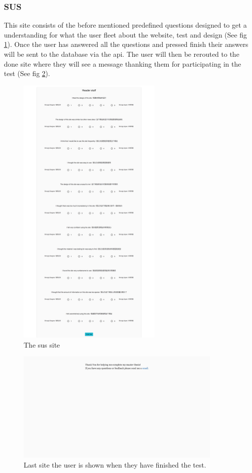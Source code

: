 \subsubsection{SUS}
This site consists of the before mentioned predefined questions designed to get a understanding for what the user fleet about the website, test and design (See fig \ref{fig:sus_site}). Once the user has answered all the questions and pressed finish their answers will be sent to the database via the api. The user will then be rerouted to the done site where they will see a message thanking them for participating in the test (See fig \ref{fig:done_site}).


\begin{figure}[h]
	\centering
	\includegraphics[width=70mm]{Images/sus.png}
	\decoRule
	\caption[SUS]{The sus site}
	\label{fig:sus_site}
\end{figure}
\begin{figure}[h]
	\centering
	\includegraphics[width=100mm]{Images/done.png}
	\decoRule
	\caption[Done]{Last site the user is shown when they have finished the test. }
	\label{fig:done_site}
\end{figure}



